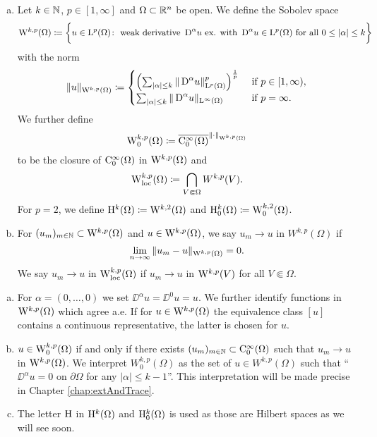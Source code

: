\begin{defn}
  \begin{enumerate}[a)]
    \item Let $k \in \mathbb{N}$, $p \in [1,\infty]$ and $\Omega \subset \mathbb{R}^n$ be open. 
      We define the Sobolev space
      $$
      \mathrm{W}^{k,p}(\Omega) \coloneqq \bigg\{u \in \mathrm{L}^p(\Omega) \colon \text{ weak derivative } \,{\operatorname{D}}^\alpha u \text{ ex. with } \,{\operatorname{D}}^\alpha u \in \mathrm{L}^p(\Omega) \text{ for all } 0 \leq |\alpha| \leq k \bigg\}
      $$
      with the norm
      $$
      \|u\|_{\mathrm{W}^{k,p}(\Omega)} \coloneqq 
      \begin{cases}
        \left( \sum_{|\alpha| \leq k} \|\,{\operatorname{D}}^\alpha u\|_{\mathrm{L}^p(\Omega)}^p \right)^{\frac{1}{p}} &\text{ if } p \in [1,\infty), \\
          \sum_{|\alpha| \leq k} \|\,{\operatorname{D}}^\alpha u\|_{\mathrm{L}^\infty(\Omega)} &\text{ if } p = \infty.
      \end{cases}
      $$
      We further define
      $$
      \mathrm{W}_0^{k,p}(\Omega) \coloneqq \overline{\mathrm{C}_0^\infty(\Omega)}^{\|\cdot\|_{\mathrm{W}^{k,p}(\Omega)}}
      $$
      to be the closure of $\mathrm{C}_0^\infty(\Omega)$ in $\mathrm{W}^{k,p}(\Omega)$ and
      $$
      \mathrm{W}_{\operatorname{loc}}^{k,p}(\Omega) \coloneqq \bigcap_{V \Subset \Omega} W^{k,p}(V).
      $$
      For $p = 2$, we define $\mathrm{H}^k(\Omega) \coloneqq \mathrm{W}^{k,2}(\Omega)$ and $\mathrm{H}_0^k(\Omega) \coloneqq \mathrm{W}_0^{k,2}(\Omega)$.
    \item For $(u_m)_{m \in \mathbb{N}} \subset \mathrm{W}^{k,p}(\Omega)$ and $u \in \mathrm{W}^{k,p}(\Omega)$, we say $u_m \to u$ in $W^{k,p}(\Omega)$ if $$\lim_{n \to \infty} \|u_m - u\|_{\mathrm{W}^{k,p}(\Omega)} = 0.$$  
      We say $u_m \to u$ in $\mathrm{W}_{\operatorname{loc}}^{k,p}(\Omega)$ if $u_m \to u$ in $\mathrm{W}^{k,p}(V)$ for all $V \Subset \Omega$.
  \end{enumerate}
\end{defn}

\begin{rem}
  \begin{enumerate}[a)]
    \item For $\alpha = (0,\dots,0)$ we set $\DD^\alpha u = \DD^0 u = u$.
      We further identify functions in $\mathrm{W}^{k,p}(\Omega)$ which agree a.e.
      If for $u \in \mathrm{W}^{k,p}(\Omega)$ the equivalence class $[u]$ contains a continuous representative, the latter is chosen for $u$.
    \item $u \in \mathrm{W}_0^{k,p}(\Omega)$ if and only if there exists $(u_m)_{m \in \mathbb{N}} \subset \mathrm{C}_0^\infty(\Omega)$ such that $u_m \to u$ in $\mathrm{W}^{k,p}(\Omega)$.
      We interpret $W_0^{k,p}(\Omega)$ as the set of $u \in W^{k,p}(\Omega)$ such that ``$\DD^\alpha u = 0$ on $\partial \Omega$ for any $|\alpha| \leq k - 1$''.
      This interpretation will be made precise in Chapter \ref{chap:extAndTrace}.
    \item The letter $\mathrm{H}$ in $\mathrm{H}^k(\Omega)$ and $\mathrm{H}_0^k(\Omega)$ is used as those are Hilbert spaces as we will see soon.
  \end{enumerate}
\end{rem}

